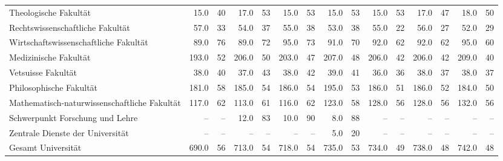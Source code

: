 \documentclass{article}
\begin{document}
\begin{longtable}{@{}l rr rr rr rr rr rr rr@{}}
    Theologische Fakultät & 15.0 & 40 & 17.0 & 53 & 15.0 & 53 & 15.0 & 53 & 15.0 & 53 & 17.0 & 47 & 18.0 & 50 \\
    Rechtswissenschaftliche Fakultät & 57.0 & 33 & 54.0 & 37 & 55.0 & 38 & 53.0 & 38 & 55.0 & 22 & 56.0 & 27 & 52.0 & 29 \\
    Wirtschaftswissenschaftliche Fakultät & 89.0 & 76 & 89.0 & 72 & 95.0 & 73 & 91.0 & 70 & 92.0 & 62 & 92.0 & 62 & 95.0 & 60 \\
    Medizinische Fakultät & 193.0 & 52 & 206.0 & 50 & 203.0 & 47 & 207.0 & 48 & 206.0 & 42 & 206.0 & 42 & 209.0 & 40 \\
    Vetsuisse Fakultät & 38.0 & 40 & 37.0 & 43 & 38.0 & 42 & 39.0 & 41 & 36.0 & 36 & 38.0 & 37 & 38.0 & 37 \\
    Philosophische Fakultät & 181.0 & 58 & 185.0 & 54 & 186.0 & 54 & 195.0 & 53 & 186.0 & 51 & 186.0 & 52 & 184.0 & 50 \\
    Mathematisch-naturwissenschaftliche Fakultät & 117.0 & 62 & 113.0 & 61 & 116.0 & 62 & 123.0 & 58 & 128.0 & 56 & 128.0 & 56 & 132.0 & 56 \\
    Schwerpunkt Forschung und Lehre & -- & -- & 12.0 & 83 & 10.0 & 90 & 8.0 & 88 & -- & -- & -- & -- & -- & -- \\
    Zentrale Dienste der Universität & -- & -- & -- & -- & -- & -- & 5.0 & 20 & -- & -- & -- & -- & -- & -- \\
    Gesamt Universität & 690.0 & 56 & 713.0 & 54 & 718.0 & 54 & 735.0 & 53 & 734.0 & 49 & 738.0 & 48 & 742.0 & 48 \\
\end{longtable}
\end{document}
